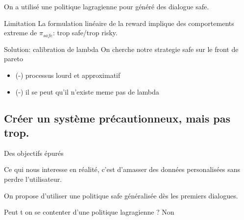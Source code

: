 \documentclass[french]{beamer}
\begin{document}
    \begin{frame}

        On a utilisé une politique lagragienne pour généré des dialogue safe.

        \begin{alertblock}{Limitation}
            La formulation linéaire de la reward implique des comportements extreme de $\pi_{safe}$: trop safe/trop risky.
        \end{alertblock}

        \begin{block}{Solution: calibration de lambda}%
            On cherche notre strategie safe sur le front de pareto
            \begin{itemize}
                \item (-) processus lourd et approximatif %
                \item (-) il se peut qu'il n'existe meme pas de lambda
            \end{itemize}
        \end{block}



    \end{frame}

    \subsection{Créer un système précautionneux, mais pas trop.}

    \begin{frame}{Des objectifs épurés}

        Ce qui nous interesse en réalité, c'est d'amasser des données personalisées sans perdre l'utilisateur.

        On propose d'utiliser une politique safe généralisée dès les premiers dialogues.

        Peut t on se contenter d'une politique lagragienne ? Non

    \end{frame}
\end{document}
